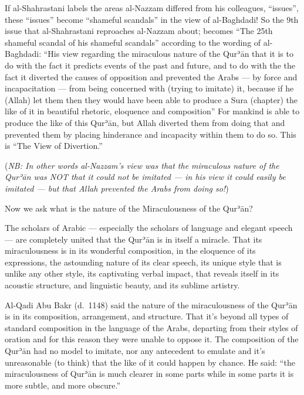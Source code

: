 \documentclass[12pt]{book}
\def \Quran{Qurʾān} %
\def \Qrn{\Quran}   %
\newcommand{\NB}[1]{\emph{NB: #1}}
\begin{document}

If al-Shahrastani labels the areas al-Nazzam differed from his colleagues,
“issues”, these “issues” become “shameful scandals” in the view of al-Baghdadi!
So the 9th issue that al-Shahrastani reproaches al-Nazzam about; becomes “The
25th shameful scandal of his shameful scandals” according to the wording of
al-Baghdadi: “His view regarding the miraculous nature of the \Qrn{} that it is
to do with the fact it predicts events of the past and future, and to do with
the the fact it diverted the causes of opposition and prevented the Arabs — by
force and incapacitation — from being concerned with (trying to imitate) it,
because if he (Allah) let them then they would have been able to produce a Sura
(chapter) the like of it in beautiful rhetoric, eloquence and composition” For
mankind is able to produce the like of this \Quran, but Allah diverted them
from doing that and prevented them by placing hinderance and incapacity within
them to do so. This is “The View of Divertion.”\footnotemark

(\NB{In other words al-Nazzam’s view was that the miraculous nature of the
\Qrn{} was NOT that it could not be imitated — in his view it could easily be
imitated — but that Allah prevented the Arabs from doing so!})


Now we ask what is the nature of the Miraculousness of the \Quran?

The scholars of Arabic — especially the scholars of language and elegant speech
— are completely united that the \Qrn{} is in itself a miracle. That its
miraculousness is in its wonderful composition, in the eloquence of its
expressions, the astounding nature of its clear speech, its unique style that
is unlike any other style, its captivating verbal impact, that reveals itself
in its acoustic structure, and linguistic beauty, and its sublime artistry.

Al-Qadi Abu Bakr (d.\ 1148) said the nature of the miraculousness of the \Quran
is in its composition, arrangement, and structure. That it’s beyond all types
of standard composition in the language of the Arabs, departing from their
styles of oration and for this reason they were unable to oppose it. The
composition of the \Qrn{} had no model to imitate, nor any antecedent to
emulate and it’s unreasonable (to think) that the like of it could happen by
chance. He said: “the miraculousness of \Qrn{} is much clearer in some parts
while in some parts it is more subtle, and more obscure.”\footnotemark
\end{document}
